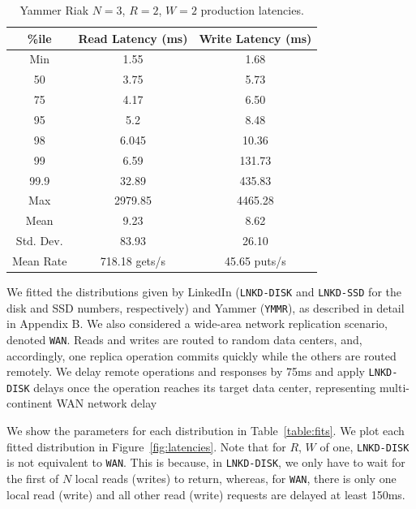\documentclass{vldb}
\begin{document}
\begin{table}
\centering
\begin{tabular}{|c|c|c|}
\hline
\%ile & Read Latency (ms) & Write Latency (ms)\\
\hline
Min & 1.55 & 1.68\\
50 & 3.75 & 5.73 \\
75 & 4.17 & 6.50\\
95 & 5.2 & 8.48\\
98 & 6.045 & 10.36 \\
99 & 6.59 & 131.73\\
99.9 & 32.89 & 435.83\\
Max & 2979.85 &  4465.28 \\
\hline
Mean & 9.23 & 8.62 \\
Std. Dev. & 83.93 & 26.10\\
\hline
Mean Rate & 718.18 gets/s & 45.65 puts/s\\
\hline
\end{tabular}
\vspace{-4pt}
\caption{Yammer Riak $N$$=$$3$, $R$$=$$2$, $W$$=$$2$ production latencies.}
\vspace{-6pt}
\label{table:yammer}
\end{table}

We fitted the distributions given by LinkedIn (\texttt{LNKD-DISK} and
\texttt{LNKD-SSD} for the disk and SSD numbers, respectively) and
Yammer (\texttt{YMMR}), as described in detail in Appendix B. We also
considered a wide-area network replication scenario, denoted
\texttt{WAN}.  Reads and writes are routed to random data centers,
and, accordingly, one replica operation commits quickly while the
others are routed remotely.  We delay remote operations and responses
by 75ms and apply \texttt{LNKD-DISK} delays once the operation reaches
its target data center, representing multi-continent WAN network
delay~\cite{dean-keynote}

We show the parameters for each distribution in
Table~\ref{table:fits}. We plot each fitted distribution in
Figure~\ref{fig:latencies}.  Note that for $R$, $W$ of one,
\texttt{LNKD-DISK} is not equivalent to \texttt{WAN}.  This is
because, in \texttt{LNKD-DISK}, we only have to wait for the first of
$N$ local reads (writes) to return, whereas, for \texttt{WAN}, there
is only one local read (write) and all other read (write) requests are
delayed at least 150ms.
\end{document}
